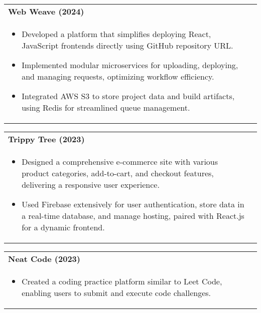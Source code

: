 \documentclass[a4paper,8pt]{article}
\begin{document}
\begin{tabularx}{\linewidth}{ @{}l r@{} }
\textbf{{Web Weave (2024)}} \hfill \color[HTML]{371e77} \\[1pt]
\begin{minipage}[t]{\linewidth}
    \begin{itemize}[nosep,after=\strut, leftmargin=2em, itemsep=2pt]
        \item Developed a platform that simplifies deploying React, JavaScript frontends directly using GitHub repository URL.
        \item Implemented modular microservices for uploading, deploying, and managing requests, optimizing workflow efficiency.
        \item Integrated AWS S3 to store project data and build artifacts, using Redis for streamlined queue management.
\end{itemize}
\end{minipage}
\end{tabularx}

\vspace{-4pt}

\begin{tabularx}{\linewidth}{ @{}l r@{} }
\textbf{{ Trippy Tree (2023)}} \hfill \color[HTML]{371e77} \\[1pt]
\begin{minipage}[t]{\linewidth}
    \begin{itemize}[nosep,after=\strut, leftmargin=2em, itemsep=2pt]
        \item Designed a comprehensive e-commerce site with various product categories, add-to-cart, and checkout features, delivering a responsive user experience.
        \item Used Firebase extensively for user authentication, store data in a real-time database, and manage hosting, paired with React.js for a dynamic frontend.
    \end{itemize}
\end{minipage}
\end{tabularx}

\vspace{-4pt}

\begin{tabularx}{\linewidth}{ @{}l r@{} }
\textbf{{ Neat Code (2023)}} \hfill \color[HTML]{371e77} \\[1pt]
\begin{minipage}[t]{\linewidth}
    \begin{itemize}[nosep,after=\strut, leftmargin=2em, itemsep=2pt]
        \item Created a coding practice platform similar to Leet Code, enabling users to submit and execute code challenges.
    \end{itemize}
\end{minipage}
\end{tabularx}
\end{document}
